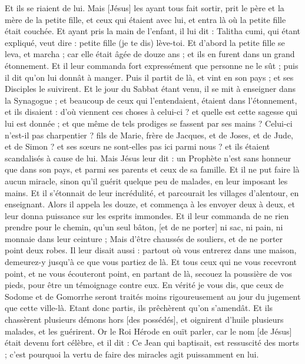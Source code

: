 \begin{multicols}{2}
Et ils se riaient de lui. Mais [Jésus] les ayant tous fait sortir, prit le père et la mère de la petite fille, et ceux qui étaient avec lui, et entra là où la petite fille était couchée.
Et ayant pris la main de l'enfant, il lui dit : Talitha cumi, qui étant expliqué, veut dire : petite fille (je te dis) lève-toi.
Et d'abord la petite fille se leva, et marcha ; car elle était âgée de douze ans ; et ils en furent dans un grand étonnement.
Et il leur commanda fort expressément que personne ne le sût ; puis il dit qu'on lui donnât à manger.
\VerseOne{}Puis il partit de là, et vint en son pays ; et ses Disciples le suivirent.
Et le jour du Sabbat étant venu, il se mit à enseigner dans la Synagogue ; et beaucoup de ceux qui l'entendaient, étaient dans l'étonnement, et ils disaient : d'où viennent ces choses à celui-ci ? et quelle est cette sagesse qui lui est donnée ; et que même de tels prodiges se fassent par ses mains ?
Celui-ci n'est-il pas charpentier ? fils de Marie, frère de Jacques, et de Joses, et de Jude, et de Simon ? et ses sœurs ne sont-elles pas ici parmi nous ? et ils étaient scandalisés à cause de lui.
Mais Jésus leur dit : un Prophète n'est sans honneur que dans son pays, et parmi ses parents et ceux de sa famille.
Et il ne put faire là aucun miracle, sinon qu'il guérit quelque peu de malades, en leur imposant les mains.
Et il s'étonnait de leur incrédulité, et parcourait les villages d'alentour, en enseignant.
Alors il appela les douze, et commença à les envoyer deux à deux, et leur donna puissance sur les esprits immondes.
Et il leur commanda de ne rien prendre pour le chemin, qu'un seul bâton, [et de ne porter] ni sac, ni pain, ni monnaie dans leur ceinture ;
Mais d'être chaussés de souliers, et de ne porter point deux robes.
Il leur disait aussi : partout où vous entrerez dans une maison, demeurez-y jusqu'à ce que vous partiez de là.
Et tous ceux qui ne vous recevront point, et ne vous écouteront point, en partant de là, secouez la poussière de vos pieds, pour être un témoignage contre eux. En vérité je vous dis, que ceux de Sodome et de Gomorrhe seront traités moins rigoureusement au jour du jugement que cette ville-là.
Etant donc partis, ils prêchèrent qu'on s'amendât.
Et ils chassèrent plusieurs démons hors [des possédés], et oignirent d'huile plusieurs malades, et les guérirent.
Or le Roi Hérode en ouït parler, car le nom [de Jésus] était devenu fort célèbre, et il dit : Ce Jean qui baptisait, est ressuscité des morts ; c'est pourquoi la vertu de faire des miracles agit puissamment en lui.

\end{multicols}
